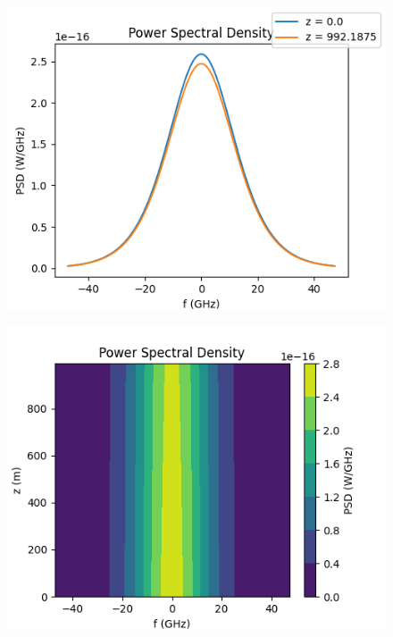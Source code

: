 \documentclass[10pt, a4paper, twocolumn]{article} %
\begin{document}
\begin{figure}
    \includegraphics[width=\linewidth]{plots/sechFreqPFL.png}
    \caption{}
    \label{sechFreqPFL}
\end{figure}

\begin{figure}
    \includegraphics[width=\linewidth]{plots/sechFreqPFL2D.png}
    \caption{}
    \label{sechFreqPFL2D}
\end{figure} 
\end{document}

